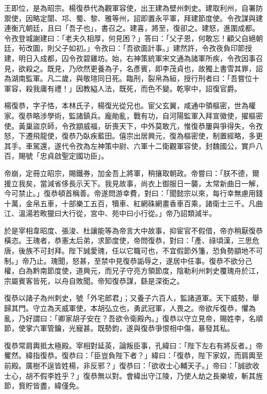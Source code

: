 \begin{pinyinscope}
 王即位，是為昭宗。楊復恭代為觀軍容使，出王建為壁州刺史。建取利州，自署防禦使，因略定閬、邛、蜀、黎、雅等州，詔即置永平軍，拜建節度使。令孜謀與建連衡亢朝廷，且曰「吾子也」，書召之。建喜，將至，復卻之。建怒，進圍成都。令孜登城謝建曰：「老夫久相厚，何見困？」答曰：「父子恩，何敢忘！顧父自絕朝廷，茍改圖，則父子如初。」令孜曰：「吾欲面計事。」建然許，令孜夜負印節授建，明日入成都，囚令孜碧雞坊。始，右神策統軍宋文通為諸軍所疾，令孜因事召見，欲殺之。既見，乃欣然更養為子，名彥賓，即李茂貞也，故獨上書雪其罪，詔為湖南監軍。凡二歲，與敬瑄同日死。臨刑，裂帛為絙，授行刑者曰：「吾嘗位十軍容，殺我庸有禮！」因教縊人法，既死，而色不變。乾寧中，詔復官爵。



 楊復恭，字子恪，本林氏子，楊復光從兄也。宦父玄翼，咸通中領樞密，世為權家。復恭略涉學術，監諸鎮兵。龐勛亂，戰有功，自河陽監軍入拜宣徽使，擢樞密使。黃巢盜京師，令孜顓威福，斫喪天下，中外莫敢亢，惟復恭屢與爭得失，令孜怒，下遷飛龍使，復恭乃臥疾藍田。僖宗出居興元，復為樞密使，制置經略，多更其手。車駕還，遂代令孜為左神策中尉、六軍十二衛觀軍容使，封魏國公，實戶八百，賜號「忠貞啟聖定國功臣」。



 帝崩，定冊立昭宗，賜鐵券，加金吾上將軍，稍攘取朝政。帝嘗曰：「朕不德，爾援立我矣，當減省侈長示天下。我見故事，尚衣上御服日一襲，太常新曲日一解，今可禁止。」復恭頓首稱善。帝遂問游幸費，對曰：「聞懿宗以來，每行幸無慮用錢十萬，金帛五車，十部樂工五百，犢車、紅網硃網畫香車百乘，諸衛士三千。凡曲江、溫湯若畋獵曰大行從，宮中、苑中曰小行從。」帝乃詔類減半。



 於是宰相韋昭度、張浚、杜讓能等為帝言大中故事，抑宦官不假借，帝亦稍厭復恭橫恣。王瑰者，恭憲太后弟，求節度使，帝問復恭，對曰：「產、祿頃漢，三思危唐，後族不可封拜。陛下誠愛瑰，任以它職可也，不宜假節外籓，恐負勢顓地不可制。」帝乃止。瑰聞，怒甚，至禁中見復恭詬辱之，遂居中任事。復恭不欲分己權，白為黔南節度使，道興元，而兄子守亮方領節度，陰勒利州刺史覆瑰舟於江，宗屬賓客皆死，以舟自敗聞。帝知復恭謀，繇是深銜之。



 復恭以諸子為州刺史，號「外宅郎君」；又養子六百人，監諸道軍。天下威勢，舉歸其門。守立為天威軍使，本胡弘立也，勇武冠軍，人畏之。帝欲斥復恭，懼為亂，乃好謂曰：「卿家胡子安在？吾欲令衛殿內。」復恭以守立見帝，賜姓李，名順節，使掌六軍管鑰，光寵甚。既勢鈞，遂與復恭爭恨相中傷，暴發其私。



 復恭常肩輿抵太極殿。宰相對延英，論叛臣事，孔緯曰：「陛下左右有將反者。」帝矍然。緯指復恭。復恭曰：「臣豈負陛下者？」緯曰：「復恭，陛下家奴，而肩輿至前殿。廣樹不逞皆姓楊，非反邪？」復恭曰：「欲收士心輔天子。」帝曰：「誠欲收士心，胡不假李姓乎？」復恭無以對。會緯出守江陵，乃使人劫之長樂坡，斬其旌節，貲貯皆盡，緯僅免。




\end{pinyinscope}
